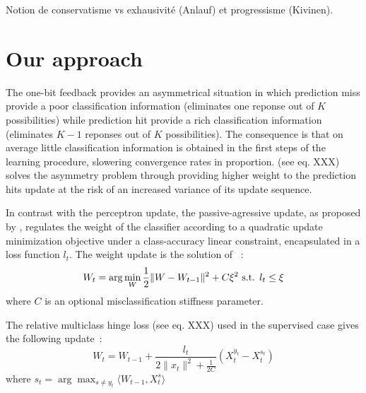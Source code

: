\documentclass[preprint,12pt,authoryear]{elsarticle}
\begin{document}
{\color{green} Notion de conservatisme vs exhausivité (Anlauf) et progressisme (Kivinen).}












\section{Our approach}

The one-bit feedback provides an asymmetrical situation in which prediction miss provide a poor classification information (eliminates one reponse out of $K$ possibilities) while prediction hit provide a rich classification information (eliminates $K-1$ reponses out of $K$ possibilities). The consequence is that on average little classification information is obtained in the first steps of the learning procedure, slowering convergence rates in proportion. \cite{kakade2008efficient} {\color{red}(see eq. XXX)} solves the asymmetry problem through providing higher weight to the prediction hits update at the risk of an increased variance of its update sequence.

In contrast with the perceptron update, the passive-agressive update, as proposed by \cite{crammer2006online}, regulates the weight of the classifier according to a quadratic update minimization objective under a class-accuracy linear constraint, encapsulated in a loss function 
$ l_t $.
The weight update is the solution of ~:
$$W_{t} = \arg \min_W \frac{1}{2} \| W - W_{t-1}\|^2 + C \xi^2 \hbox{ s.t. } l_t \leq \xi$$
where $C$ is an optional misclassification stiffness parameter.

The relative multiclass hinge loss {\color{red}(see eq. XXX)} used in the supervised case gives the following update~:
$$W_{t} =  W_{t-1} + \frac{l_t}{2\|x_t\|^2 + \frac{1}{2C}} (X_t^{y_t} - X_t^{s_t})$$
where $s_t = \arg\max_{s \neq y_t} \langle W_{t-1}, X_t^s \rangle$
\end{document}
